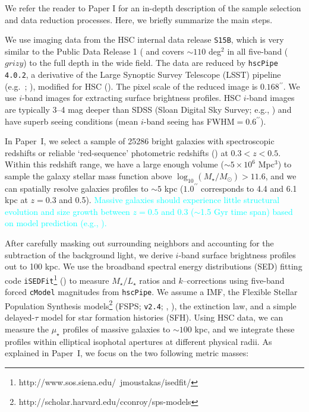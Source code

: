 \documentclass[a4paper,fleqn,usenatbib]{mnras}
\def\arcsec{{\prime\prime}}
\def\asec{$^{\prime\prime}$}
\def\cmodel{\texttt{cModel}}
\def\logms{{$\log_{10} (M_{\star}/M_{\odot})$}}
\def\m2l{{$M_{\star}/L_{\star}$}}
\def\mden{{$\mu_{\star}$}}
\newcommand{\song}[1]{\textcolor{cyan}{#1}}
\begin{document}
    We refer the reader to Paper I for an in-depth description of the sample selection 
    and data reduction processes. 
    Here, we briefly summarize the main steps.
    
    We use imaging data from the HSC internal data release 
    \texttt{S15B}, which is very similar to the Public Data Release 1 
    (\citealt{HSC-DR1} and covers ${\sim} 110$ deg$^2$ in all five-band ($grizy$) to 
    the full depth in the wide field. 
    The data are reduced by \texttt{hscPipe 4.0.2}, a derivative of the 
    Large Synoptic Survey Telescope (LSST) pipeline (e.g.\ \citealt{Juric2015}; 
    \citealt{Axelrod2010}), modified for HSC (\citealt{HSC-PIPE}).
    The pixel scale of the reduced image is $0.168$\asec{}.
    We use $i$-band images for extracting surface brightness profiles. 
    HSC $i$-band images are typically 3--4 mag deeper than SDSS 
    (Sloan Digital Sky Survey; e.g., \citealt{SDSS-DR7, SDSS-DR8, SDSS-DR12})  
    and have superb seeing conditions (mean $i$-band seeing has FWHM$=0.6$\asec{}).
    
    In Paper~I, we select a sample of 25286 bright galaxies with spectroscopic 
    redshifts or reliable `red-sequence' photometric redshifts (\citealt{Rykoff2014}) 
    at $0.3<z<0.5$. 
    Within this redshift range, we have a large enough volume 
    ($\sim5\times 10^6$ Mpc$^3$) to sample the galaxy stellar mass function above 
    \logms$>11.6$, and we can spatially resolve galaxies profiles to $\sim 5$ kpc 
    ($1.0^{\arcsec}$ corresponds to 4.4 and 6.1 kpc at $z=0.3$ and 0.5). 
    \song{
    Massive galaxies should experience little structural evolution and 
    size growth between $z=0.5$ and 0.3 ($\sim$1.5 Gyr time span) 
    based on model prediction (e.g., \citealt{Shankar2015}).
    }
    
    After carefully 
    masking out surrounding neighbors and accounting for the subtraction of the 
    background light, we derive $i$-band surface brightness profiles out to 100 kpc. 
    We use the broadband spectral energy distributions (SED) fitting code 
    \texttt{iSEDFit}\footnote{http://www.sos.siena.edu/~jmoustakas/isedfit/} 
    (\citealt{Moustakas13}) to measure \m2l{} ratios and $k$--corrections using 
    five-band forced \cmodel{} magnitudes from \texttt{hscPipe}. 
    We assume a \citet{Chabrier2003} IMF, the Flexible Stellar Population 
    Synthesis models\footnote{http://scholar.harvard.edu/cconroy/sps-models}
    (FSPS; \texttt{v2.4}; \citealt{FSPS}, \citealt{Conroy2010}), the 
    \citet{Calzetti2000} extinction law, and a simple delayed-$\tau$ model for 
    star formation histories (SFH). 
    Using HSC data, we can measure the \mden{} profiles of massive galaxies to 
    $\sim 100$ kpc, and we integrate these profiles within elliptical isophotal
    apertures at different physical radii. 
    As explained in Paper~I, we focus on the two following metric masses:
        
\end{document}
